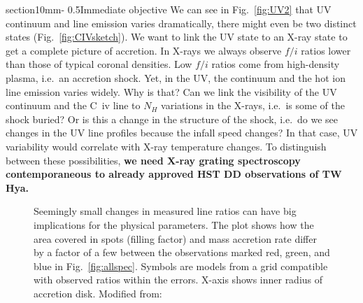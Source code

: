 \documentclass[letterpaper,11pt,twocolumn]{article}
\makeatletter
\renewcommand{\section}{\@startsection%
{section}{1}{0mm}{-\baselineskip}%
{0.5\baselineskip}{\normalfont\Large\bfseries}}%
\makeatother
\begin{document}
\section{Immediate objective}
We can see in Fig.~\ref{fig:UV2} that UV continuum and line emission varies dramatically, there might even be two distinct states (Fig.~\ref{fig:CIVsketch}). We want to link the UV state to an X-ray state to get a complete picture of accretion. In X-rays we always observe $f/i$ ratios lower than those of typical coronal densities. Low $f/i$ ratios come from high-density plasma, i.e.\ an accretion shock. Yet, in the UV, the continuum and the hot ion line emission varies widely. Why is that? Can we link the visibility of the UV continuum and the C~{\sc iv} line to $N_H$ variations in the X-rays, i.e.\ is some of the shock buried? Or is this a change in the structure of the shock, i.e.\ do we see changes in the UV line profiles because the infall speed changes? In that case, UV variability would correlate with X-ray temperature changes.
To distinguish between these possibilities, \textbf{we need X-ray grating spectroscopy contemporaneous to already approved HST DD observations of TW Hya.}




\begin{figure}[t!]
\centering
{}
\caption{Seemingly small changes in measured line ratios can have big
  implications for the physical parameters. The plot shows how the
  area covered in spots (filling factor) and mass accretion rate
  differ by a factor of a few between the observations marked red,
  green, and blue in Fig.~\ref{fig:allspec}. Symbols are models from a
  grid compatible with observed ratios within the errors. X-axis shows
  inner radius of accretion disk. Modified from:
\label{fig:Brickhouse_3} }
\end{figure}
\end{document}
